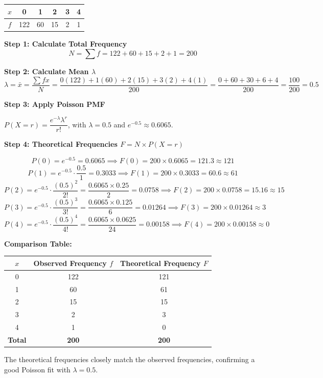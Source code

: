 \documentclass[12pt,a4paper]{article}
\begin{document}
\begin{center}
\begin{tabular}{|c|c|c|c|c|c|}
\hline
$x$ & 0 & 1 & 2 & 3 & 4 \\
\hline
$f$ & 122 & 60 & 15 & 2 & 1 \\
\hline
\end{tabular}
\end{center}

\textbf{Step 1: Calculate Total Frequency}
\[
N = \sum f = 122 + 60 + 15 + 2 + 1 = 200
\]

\textbf{Step 2: Calculate Mean $\lambda$}
\[
\lambda = \bar{x} = \frac{\sum fx}{N} = \frac{0(122)+1(60)+2(15)+3(2)+4(1)}{200} = \frac{0+60+30+6+4}{200} = \frac{100}{200} = 0.5
\]

\textbf{Step 3: Apply Poisson PMF}

$P(X=r) = \dfrac{e^{-\lambda}\lambda^r}{r!}$, with $\lambda = 0.5$ and $e^{-0.5} \approx 0.6065$.

\textbf{Step 4: Theoretical Frequencies $F = N \times P(X=r)$}

\[
P(0) = e^{-0.5} = 0.6065 \implies F(0) = 200 \times 0.6065 = 121.3 \approx 121
\]
\[
P(1) = e^{-0.5}\cdot\frac{0.5}{1} = 0.3033 \implies F(1) = 200 \times 0.3033 = 60.6 \approx 61
\]
\[
P(2) = e^{-0.5}\cdot\frac{(0.5)^2}{2!} = \frac{0.6065 \times 0.25}{2} = 0.0758 \implies F(2) = 200 \times 0.0758 = 15.16 \approx 15
\]
\[
P(3) = e^{-0.5}\cdot\frac{(0.5)^3}{3!} = \frac{0.6065 \times 0.125}{6} = 0.01264 \implies F(3) = 200 \times 0.01264 \approx 3
\]
\[
P(4) = e^{-0.5}\cdot\frac{(0.5)^4}{4!} = \frac{0.6065 \times 0.0625}{24} = 0.00158 \implies F(4) = 200 \times 0.00158 \approx 0
\]

\textbf{Comparison Table:}

\begin{center}
\begin{tabular}{|c|c|c|}
\hline
$x$ & Observed Frequency $f$ & Theoretical Frequency $F$ \\
\hline
0 & 122 & 121 \\
1 & 60 & 61 \\
2 & 15 & 15 \\
3 & 2 & 3 \\
4 & 1 & 0 \\
\hline
\textbf{Total} & \textbf{200} & \textbf{200} \\
\hline
\end{tabular}
\end{center}

The theoretical frequencies closely match the observed frequencies, confirming a good Poisson fit with $\lambda = 0.5$.
\end{document}
